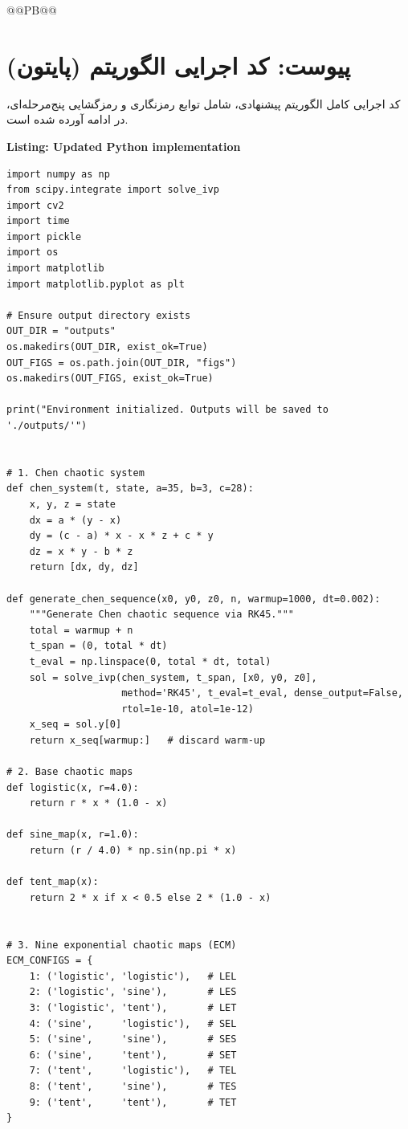 @@PB@@



\chapter{پیوست: کد اجرایی الگوریتم (پایتون)}


کد اجرایی کامل الگوریتم پیشنهادی، شامل توابع رمزنگاری و رمزگشایی پنج‌مرحله‌ای، در ادامه آورده شده است.


\noindent\textbf{Listing: Updated Python implementation}



\begin{verbatim}
import numpy as np
from scipy.integrate import solve_ivp
import cv2
import time
import pickle
import os
import matplotlib
import matplotlib.pyplot as plt

# Ensure output directory exists
OUT_DIR = "outputs"
os.makedirs(OUT_DIR, exist_ok=True)
OUT_FIGS = os.path.join(OUT_DIR, "figs")
os.makedirs(OUT_FIGS, exist_ok=True)

print("Environment initialized. Outputs will be saved to './outputs/'")


# 1. Chen chaotic system
def chen_system(t, state, a=35, b=3, c=28):
    x, y, z = state
    dx = a * (y - x)
    dy = (c - a) * x - x * z + c * y
    dz = x * y - b * z
    return [dx, dy, dz]

def generate_chen_sequence(x0, y0, z0, n, warmup=1000, dt=0.002):
    """Generate Chen chaotic sequence via RK45."""
    total = warmup + n
    t_span = (0, total * dt)
    t_eval = np.linspace(0, total * dt, total)
    sol = solve_ivp(chen_system, t_span, [x0, y0, z0],
                    method='RK45', t_eval=t_eval, dense_output=False,
                    rtol=1e-10, atol=1e-12)
    x_seq = sol.y[0]
    return x_seq[warmup:]   # discard warm-up

# 2. Base chaotic maps
def logistic(x, r=4.0):
    return r * x * (1.0 - x)

def sine_map(x, r=1.0):
    return (r / 4.0) * np.sin(np.pi * x)

def tent_map(x):
    return 2 * x if x < 0.5 else 2 * (1.0 - x)


# 3. Nine exponential chaotic maps (ECM)
ECM_CONFIGS = {
    1: ('logistic', 'logistic'),   # LEL
    2: ('logistic', 'sine'),       # LES
    3: ('logistic', 'tent'),       # LET
    4: ('sine',     'logistic'),   # SEL
    5: ('sine',     'sine'),       # SES
    6: ('sine',     'tent'),       # SET
    7: ('tent',     'logistic'),   # TEL
    8: ('tent',     'sine'),       # TES
    9: ('tent',     'tent'),       # TET
}


\end{verbatim}
